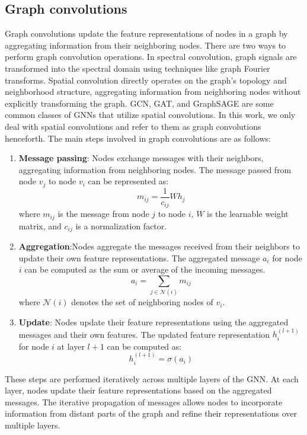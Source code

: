 \subsection{Graph convolutions}
Graph convolutions update the feature representations of nodes in a graph by aggregating information from their neighboring nodes. There are two ways to perform graph convolution operations. In spectral convolution, graph signals are transformed into the spectral domain using techniques like graph Fourier transforms. Spatial convolution directly operates on the graph's topology and neighborhood structure, aggregating information from neighboring nodes without explicitly transforming the graph. \gls{GCN}, \gls{GAT}, and GraphSAGE are some common classes of GNNs that utilize spatial convolutions. In this work, we only deal with spatial convolutions and refer to them as graph convolutions henceforth. The main steps involved in graph convolutions are as follows:
\begin{enumerate}
    \item \textbf{Message passing}: Nodes exchange messages with their neighbors, aggregating information from neighboring nodes. The message passed from node $v_j$ to node $v_i$ can be represented as:
        \[ m_{ij} = \frac{1}{c_{ij}} W h_j \]
        where $m_{ij}$ is the message from node $j$ to node $i$, $W$ is the learnable weight matrix, and $c_{ij}$ is a normalization factor.
    
    \item \textbf{Aggregation}:Nodes aggregate the messages received from their neighbors to update their own feature representations. The aggregated message $a_i$ for node $i$ can be computed as the sum or average of the incoming messages.
        \[ a_i = \sum_{j \in \mathcal{N}(i)} m_{ij} \]
    where $\mathcal{N}(i)$ denotes the set of neighboring nodes of $v_i$.
    \item \textbf{Update}: Nodes update their feature representations using the aggregated messages and their own features. The updated feature representation $h_i^{(l+1)}$ for node $i$ at layer $l+1$ can be computed as:
        \[ h_i^{(l+1)} = \sigma(a_i) \]
\end{enumerate}
These steps are performed iteratively across multiple layers of the GNN. At each layer, nodes update their feature representations based on the aggregated messages. The iterative propagation of messages allows nodes to incorporate information from distant parts of the graph and refine their representations over multiple layers. \\
